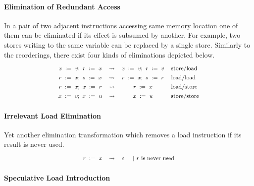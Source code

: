 \paragraph{Elimination of Redundant Access} 

In a pair of two adjacent instructions accessing same memory location  
one of them can be eliminated if its effect is subsumed by another. 
For example, two stores writing to the same variable 
can be replaced by a single store.  
Similarly to the reorderings, there exist four kinds 
of eliminations depicted below. 
%
\[\def\arraystretch{1.4}\footnotesize
  \begin{array}{cccl} 

      \writeInst{}{x}{v} \seq \readInst{}{r}{x} 
    & \leadsto 
    & \writeInst{}{x}{v} \seq \assignInst{r}{v}
    & \text{store/load}  \\ 

      \readInst{}{r}{x} \seq \readInst{}{s}{x} 
    & \leadsto 
    & \readInst{}{r}{x} \seq \assignInst{s}{r}
    & \text{load/load}  \\ 

      \readInst{}{r}{x} \seq \writeInst{}{x}{r} 
    & \leadsto 
    & \readInst{}{r}{x} 
    & \text{load/store}  \\ 

      \writeInst{}{x}{v} \seq \writeInst{}{x}{u} 
    & \leadsto 
    & \writeInst{}{x}{u}
    & \text{store/store}  \\ 

  \end{array}
\]

\paragraph{Irrelevant Load Elimination}

Yet another elimination transformation 
which removes a load instruction if its 
result is never used. 
%
\[\def\arraystretch{1.4}\footnotesize
  \begin{array}{cccl} 

      \readInst{}{r}{x} 
    & \leadsto 
    & \epsInst
    & ~|~ \text{$r$ is never used}  \\ 

  \end{array}
\]

\paragraph{Speculative Load Introduction}

